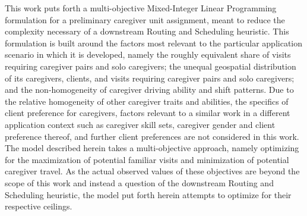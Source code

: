 \documentclass[11pt,twoside]{article}
\numberwithin{Theorem}{section}
\numberwithin{Definition}{section}
\numberwithin{Lemma}{section}
\numberwithin{Algorithm}{section}
\numberwithin{equation}{section}
\begin{document}
This work puts forth a multi-objective Mixed-Integer Linear Programming formulation for a preliminary caregiver unit assignment, meant to reduce the complexity necessary of a downstream Routing and Scheduling heuristic. This formulation is built around the factors most relevant to the particular application scenario in which it is developed, namely the roughly equivalent share of visits requiring caregiver pairs and solo caregivers; the unequal geospatial distribution of its caregivers, clients, and visits requiring caregiver pairs and solo caregivers; and the non-homogeneity of caregiver driving ability and shift patterns. Due to the relative homogeneity of other caregiver traits and abilities, the specifics of client preference for caregivers, factors relevant to a similar work in a different application context such as caregiver skill sets, caregiver gender and client preference thereof, and further client preferences are not considered in this work. The model described herein takes a multi-objective approach, namely optimizing for the maximization of potential familiar visits and minimization of potential caregiver travel. As the actual observed values of these objectives are beyond the scope of this work and instead a question of the downstream Routing and Scheduling heuristic, the model put forth herein attempts to optimize for their respective ceilings. 
\end{document}
